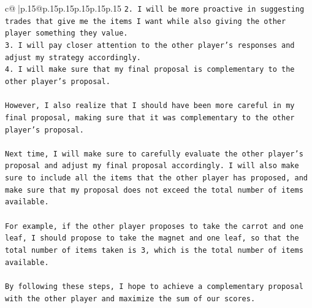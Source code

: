 \documentclass{article}
\begin{document}
{\begin{supertabular}{c@{$\;$}|p{.15\linewidth}@{}p{.15\linewidth}p{.15\linewidth}p{.15\linewidth}p{.15\linewidth}p{.15\linewidth}}
{{{\texttt{2. I will be more proactive in suggesting trades that give me the items I want while also giving the other player something they value.} \\
\texttt{3. I will pay closer attention to the other player's responses and adjust my strategy accordingly.} \\
\texttt{4. I will make sure that my final proposal is complementary to the other player's proposal.} \\
\\ 
\texttt{However, I also realize that I should have been more careful in my final proposal, making sure that it was complementary to the other player's proposal. } \\
\\ 
\texttt{Next time, I will make sure to carefully evaluate the other player's proposal and adjust my final proposal accordingly. I will also make sure to include all the items that the other player has proposed, and make sure that my proposal does not exceed the total number of items available. } \\
\\ 
\texttt{For example, if the other player proposes to take the carrot and one leaf, I should propose to take the magnet and one leaf, so that the total number of items taken is 3, which is the total number of items available. } \\
\\ 
\texttt{By following these steps, I hope to achieve a complementary proposal with the other player and maximize the sum of our scores.} \\
            }
        }
    }
     \\ \\

\end{supertabular}
}
\end{document}
